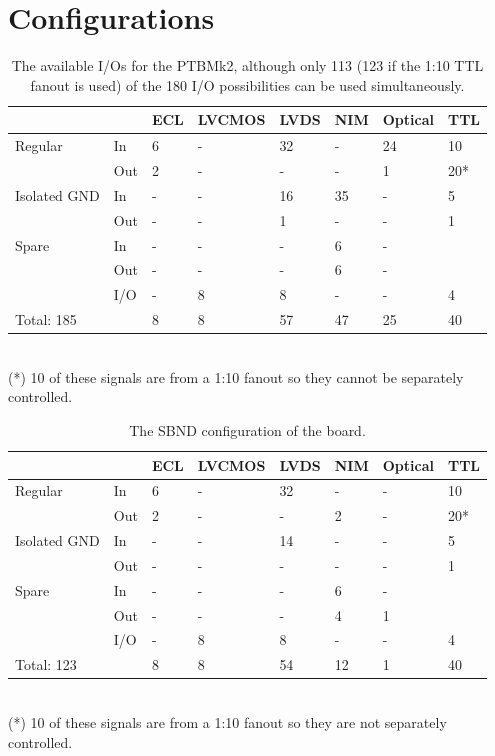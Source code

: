 \documentclass{report}
\begin{document}
\section{Configurations}

\begin{table}[H]
   \centering
   \caption{The available I/Os for the PTBMk2, although only 113 (123 if the 1:10 TTL fanout is used) 
                of the 180 I/O possibilities can be used simultaneously. }
      \renewcommand{\arraystretch}{1.75}
         \begin{tabular}{llllllll}
            \toprule
               & &ECL & LVCMOS & LVDS & NIM & Optical & TTL \\
            \midrule
               Regular &In & 6 & - & 32 & - & 24 & 10\\
               &Out & 2 & - & - & - & 1 & 20*\\
            \midrule
                Isolated GND & In & - & - & 16 & 35 & - & 5\\
                & Out & - &  -& 1 & - & - & 1\\
            \midrule
                Spare & In & - & -  & -  & 6 & - & \\
                & Out & - & - & - & 6 & - &\\  
                & I/O & - & 8 & 8 & - & - & 4\\  
            \midrule
             Total: 185  & & 8 & 8 & 57 & 47 & 25 & 40 \\
            \bottomrule
         \end{tabular} 
        \\ (*) 10 of these signals are from a 1:10 fanout so they  cannot be separately controlled.\\
\end{table}
\begin{table}[H]
   \centering
    \caption{The SBND configuration of the board. }
      \renewcommand{\arraystretch}{1.75}
         \begin{tabular}{llllllll}
            \toprule
               & &ECL & LVCMOS & LVDS & NIM & Optical & TTL \\
            \midrule
               Regular &In & 6 & - & 32 & - & - & 10\\
               &Out & 2 & - & - & 2 & - & 20*\\
            \midrule
               Isolated GND & In & - & - & 14 & - & - & 5\\
               & Out & - &  -& - & - & - & 1\\
           \midrule
               Spare & In & - & -  & -  & 6 & - & \\
               & Out & - & - & - & 4 & 1 &\\  
               & I/O & - & 8 & 8 & - & - & 4\\  
           \midrule
               Total: 123 &  & 8 & 8 & 54 & 12 & 1 & 40 \\
          \bottomrule
        \end{tabular}
           \\ (*)     10 of these signals are from a 1:10 fanout so they are not separately controlled.
 \end{table}
\end{document}
